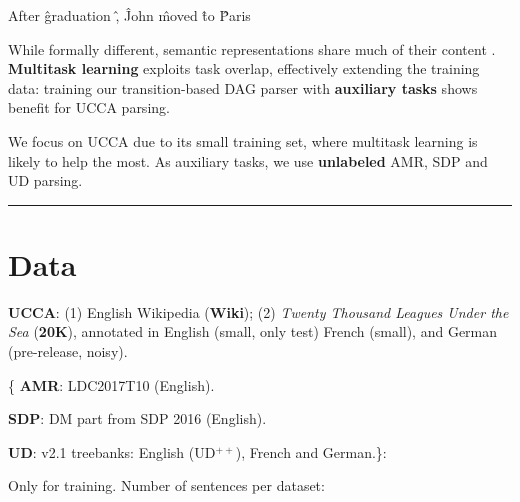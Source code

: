 \documentclass[a0,portrait]{a0poster}
\begin{document}
\begin{multicols}{2}
\begin{minipage}{.55\columnwidth}
\begin{center}
\begin{dependency}[edge style={-{Latex[length=4mm]}, color=DarkRed},
        text only label, label style={above, color=DarkRed, font=\bf\ttfamily}, font=\small]
    \end{dependency}
    \vfill
    \begin{dependency}[edge style={-{Latex[length=4mm]}, color=DarkBlue},
        text only label, label style={above, color=DarkBlue, font=\bf\ttfamily}, font=\small]
    \begin{deptext}[column sep=.8em,ampersand replacement=\^]
    After \^ graduation \^ , \^ John \^ moved \^ to \^ Paris \\
    \end{deptext}
    \end{dependency}
  \end{center}
\end{minipage}

While formally different, semantic representations
share much of their content \cite{abend2017state}.
\textbf{Multitask learning} exploits task overlap,
effectively extending the training data:
training our transition-based DAG parser with \textbf{auxiliary tasks}
shows benefit for UCCA parsing.


We focus on UCCA due to its small training set,
where multitask learning is likely to help the most.
As auxiliary tasks, we use \textbf{unlabeled} AMR, SDP and UD parsing.

\hrule

\section*{Data}

\begin{itemize*}
\item [\textbf{\color{Indigo} UCCA}:] \color{Indigo} (1) English Wikipedia (\textbf{Wiki});
(2) \textit{Twenty Thousand Leagues Under the Sea} (\textbf{20K}),
annotated in English (small, only test) French (small), and German
(pre-release, noisy).
\item [\{\textbf{\color{DarkGreen} AMR}:] \color{DarkGreen} LDC2017T10 (English).
\item [\textbf{\color{DarkRed} SDP}:] \color{DarkRed} DM part from SDP 2016 (English).
\item [\textbf{\color{DarkBlue} UD}:] {\color{DarkBlue} v2.1 treebanks:
English (UD$^{++}$), French and German.}\}:
\end{itemize*}
Only for training.
\hfill Number of sentences per dataset:


\end{multicols}
\end{document}
